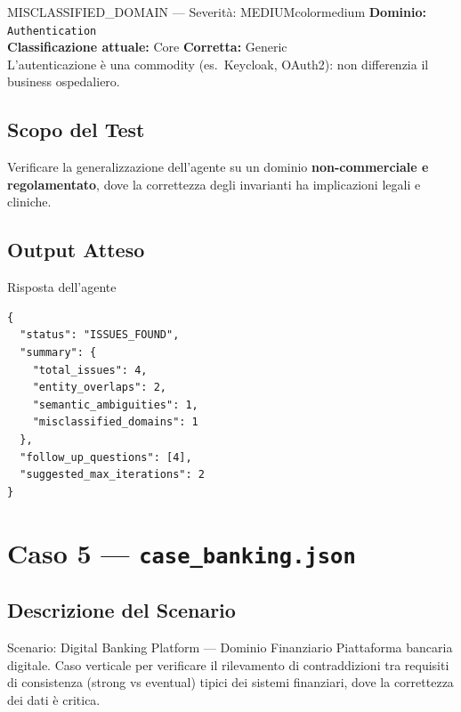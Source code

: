 \documentclass[12pt,a4paper]{report}
\begin{document}
\begin{issuebox}{MISCLASSIFIED\_DOMAIN --- Severità: MEDIUM}{colormedium}
\textbf{Dominio:} \texttt{Authentication} \\
\textbf{Classificazione attuale:} Core \quad \textbf{Corretta:} Generic \\
L'autenticazione è una commodity (es.\ Keycloak, OAuth2): non differenzia il business
ospedaliero.
\end{issuebox}

\section{Scopo del Test}

Verificare la generalizzazione dell'agente su un dominio \textbf{non-commerciale e regolamentato},
dove la correttezza degli invarianti ha implicazioni legali e cliniche.
\clearpage
\section{Output Atteso}

\begin{outputbox}{Risposta dell'agente}
\begin{lstlisting}
{
  "status": "ISSUES_FOUND",
  "summary": {
    "total_issues": 4,
    "entity_overlaps": 2,
    "semantic_ambiguities": 1,
    "misclassified_domains": 1
  },
  "follow_up_questions": [4],
  "suggested_max_iterations": 2
}
\end{lstlisting}
\end{outputbox}

\clearpage

\chapter{Caso 5 --- \texttt{case\_banking.json}}

\section{Descrizione del Scenario}

\begin{technicalbox}{Scenario: Digital Banking Platform --- Dominio Finanziario}
Piattaforma bancaria digitale. Caso verticale per verificare il rilevamento di
contraddizioni tra requisiti di consistenza (strong vs eventual) tipici dei
sistemi finanziari, dove la correttezza dei dati è critica.
\end{technicalbox}
\end{document}
